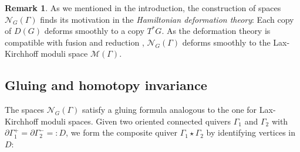\documentclass[reqno]{amsart}
\theoremstyle{plain}
\theoremstyle{definition}
\newtheorem{Rem}[Thm]{Remark}
\newcommand{\M}{\mathcal{M}}
\newcommand{\N}{\mathcal{N}}
\begin{document}
\begin{Rem}
As we mentioned in the introduction, the construction of spaces $\N_G(\Gamma)$ finds its motivation in the \emph{Hamiltonian deformation theory}: Each copy of $D(G)$ deforms smoothly to a copy $T^{*}G$. As the deformation theory is compatible with fusion and reduction \cite[Theorem~3.3, Corollary~3.2]{JMM2025deformations}, $\N_G(\Gamma)$ deforms smoothly to the Lax-Kirchhoff moduli space $\M(\Gamma).$
\end{Rem}
\subsection{Gluing and homotopy invariance}

The spaces $\N_G(\Gamma)$ satisfy a gluing formula analogous to the one for Lax-Kirchhoff moduli spaces. Given two oriented connected quivers $\Gamma_1$ and $\Gamma_2$ with $\partial \Gamma_1^{+} = \partial \Gamma_2^{-} =: D$, we form the composite quiver $\Gamma_1 \star \Gamma_2$ by identifying vertices in $D$:
\end{document}
